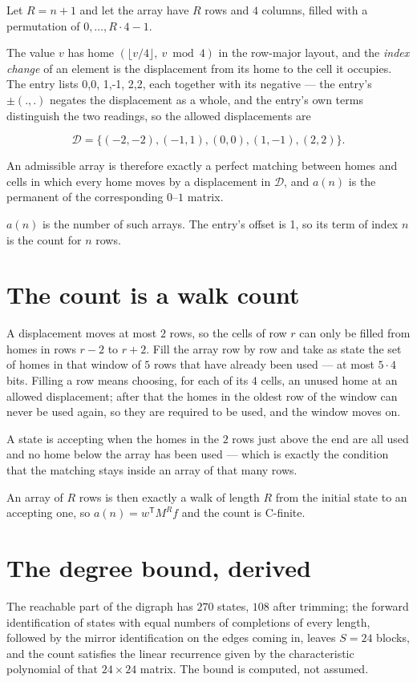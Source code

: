 \documentclass[11pt]{article}
\theoremstyle{definition}
\begin{document}
Let $R = n + 1$ and let the array have $R$ rows and $4$ columns, filled with a permutation of $0,\dots,R\cdot4-1$.

The value $v$ has home $(\lfloor v/4\rfloor,\ v \bmod 4)$ in the row-major layout, and the {\itshape index change} of an element is the displacement from its home to the cell it occupies. The entry lists 0,0, 1,-1, 2,2, each together with its negative --- the entry's $\pm(.,.)$ negates the displacement as a whole, and the entry's own terms distinguish the two readings, so the allowed displacements are

\[\mathcal{D} = \{(-2,-2), (-1,1), (0,0), (1,-1), (2,2)\}.\]

An admissible array is therefore exactly a perfect matching between homes and cells in which every home moves by a displacement in $\mathcal{D}$, and $a(n)$ is the permanent of the corresponding $0$--$1$ matrix.

$a(n)$ is the number of such arrays. The entry's offset is 1, so its term of index $n$ is the count for $n$ rows.

\section{The count is a walk count}

A displacement moves at most $2$ rows, so the cells of row $r$ can only be filled from homes in rows $r-2$ to $r+2$. Fill the array row by row and take as state the set of homes in that window of $5$ rows that have already been used --- at most $5\cdot4$ bits. Filling a row means choosing, for each of its $4$ cells, an unused home at an allowed displacement; after that the homes in the oldest row of the window can never be used again, so they are required to be used, and the window moves on.

A state is accepting when the homes in the $2$ rows just above the end are all used and no home below the array has been used --- which is exactly the condition that the matching stays inside an array of that many rows.

An array of $R$ rows is then exactly a walk of length $R$ from the initial state to an accepting one, so $a(n) = w^{\mathsf T}M^{R}f$ and the count is C-finite.

\section{The degree bound, derived}

The reachable part of the digraph has $270$ states, $108$ after trimming; the forward identification of states with equal numbers of completions of every length, followed by the mirror identification on the edges coming in, leaves $S = 24$ blocks, and the count satisfies the linear recurrence given by the characteristic polynomial of that $24\times24$ matrix. The bound is computed, not assumed.
\end{document}
